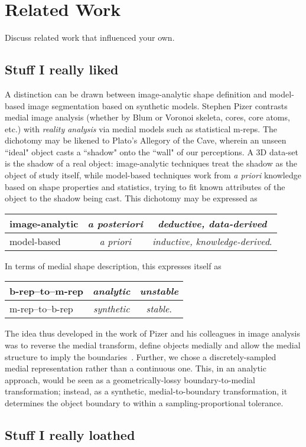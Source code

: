 %
%
\chapter{Related Work}\label{ch:relatedwork}

Discuss related work that influenced your own.

\section{Stuff I really liked}

A distinction can be drawn between image-analytic shape definition and model-based image
segmentation based on synthetic models.  Stephen Pizer contrasts medial image analysis
(whether by Blum or Voronoi skeleta, cores, core atoms, etc.) with
\emph{reality analysis} via medial models such as statistical m-reps.  The dichotomy may
be likened to Plato's Allegory of the Cave\cite{Plato:360BC}, wherein an unseen ``ideal"
object casts a ``shadow" onto the ``wall" of our perceptions.  A 3D data-set is the shadow
of a real object:  image-analytic techniques treat the shadow as the object of study itself,
while model-based techniques work from \emph{a priori} knowledge based on shape properties
and statistics, trying to fit known attributes of the object to the shadow being cast.
This dichotomy may be expressed as
\begin{center}
\begin{tabular}{l|c|c}
image-analytic & \emph{a posteriori}& \emph{deductive, data-derived} \\
\hline
model-based & \emph{a priori}& \emph{inductive, knowledge-derived}.
\end{tabular}
\end{center}
In terms of medial shape description, this expresses itself as
\begin{center}
\begin{tabular}{l|c|c}
b-rep--to--m-rep & \emph{analytic}& \emph{unstable} \\
\hline
m-rep--to--b-rep & \emph{synthetic}& \emph{stable}.
\end{tabular}
\end{center}
The idea thus developed in the work of Pizer and his colleagues in image analysis was to
reverse the medial transform, define objects medially and allow the medial structure
to imply the boundaries~\cite{Pizer99b}.  Further, we chose a discretely-sampled medial
representation rather than a continuous one.  This, in an analytic approach, would be seen
as a geometrically-lossy boundary-to-medial transformation; instead, as a synthetic,
medial-to-boundary transformation, it determines the object boundary to within
a sampling-proportional tolerance.

\section{Stuff I really loathed}
